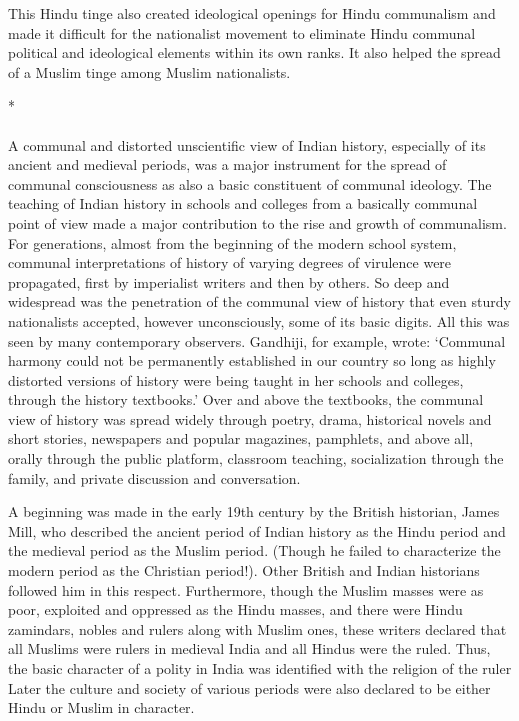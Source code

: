 \begin{multicols}{2}
This Hindu tinge also created ideological openings for Hindu communalism and made it difficult for the nationalist movement to eliminate Hindu communal political and ideological elements within its own ranks. It also helped the spread of a Muslim tinge among Muslim nationalists.

\begin{center}*\end{center}

\paragraph*{}

A communal and distorted unscientific view of Indian history, especially of its ancient and medieval periods, was a major instrument for the spread of communal consciousness as also a basic constituent of communal ideology. The teaching of Indian history in schools and colleges from a basically communal point of view made a major contribution to the rise and growth of communalism. For generations, almost from the beginning of the modern school system, communal interpretations of history of varying degrees of virulence were propagated, first by imperialist writers and then by others. So deep and widespread was the penetration of the communal view of history that even sturdy nationalists accepted, however unconsciously, some of its basic digits. All this was seen by many contemporary observers. Gandhiji, for example, wrote: `Communal harmony could not be permanently established in our country so long as highly distorted versions of history were being taught in her schools and colleges, through the history textbooks.' Over and above the textbooks, the communal view of history was spread widely through poetry, drama, historical novels and short stories, newspapers and popular magazines, pamphlets, and above all, orally through the public platform, classroom teaching, socialization through the family, and private discussion and conversation. 

A beginning was made in the early 19th century by the British historian, James Mill, who described the ancient period of Indian history as the Hindu period and the medieval period as the Muslim period. (Though he failed to characterize the modern period as the Christian period!). Other British and Indian historians followed him in this respect. Furthermore, though the Muslim masses were as poor, exploited and oppressed as the Hindu masses, and there were Hindu zamindars, nobles and rulers along with Muslim ones, these writers declared that all Muslims were rulers in medieval India and all Hindus were the ruled. Thus, the basic character of a polity in India was identified with the religion of the ruler Later the culture and society of various periods were also declared to be either Hindu or Muslim in character. 


\end{multicols}

